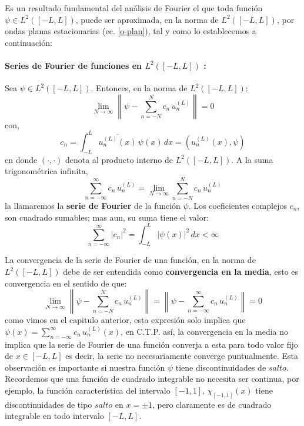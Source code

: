 \documentclass[12pt]{book}
\numberwithin{equation}{chapter}
\def\ol{\overline}
\def\rar{\rightarrow}
\begin{document}
Es un resultado fundamental del an\'alisis de Fourier el que toda funci\'on $\psi \in L^{2}([-L,L])$, puede ser aproximada, en la norma de $L^{2}([-L,L])$, por ondas planas estacionarias (ec. \ref{o-plan}), tal y como lo establecemos a continuaci\'on:

\paragraph{Series de Fourier de funciones en $L^{2}([-L,L])$ :} Sea $\psi \in L^{2}([-L,L])$. Entonces, en la norma de $L^{2}([-L,L])$:
\begin{equation}\label{sn-con}
\lim_{N \rar \infty} \left\| \psi - \sum_{n=-N}^{N} c_{n}\, u_{n}^{(L)} \right\|=0
\end{equation} 
con,
\begin{equation}
c_{n}= \int_{-L}^{L} \ol{u_{n}^{(L)}(x)}\, \psi(x)\, dx= (u_{n}^{(L)}(x),\psi)
\end{equation}
en donde $(\cdot , \cdot)$ denota al producto interno de $L^{2}([-L,L])$. A la suma trigonom\'etrica infinita,
\begin{equation}
\sum_{n=-\infty}^{\infty} c_{n}\, u_{n}^{(L)} =\lim_{N\rar \infty} \sum_{n=-N}^{N} c_{n}\, u_{n}^{(L)}
\end{equation}
la llamaremos la {\bf serie de Fourier} de la funci\'on $\psi$. Los coeficientes complejos $c_{n}$, son cuadrado sumables; mas aun, su suma tiene el valor:
\begin{equation}
\sum_{n=-\infty}^{\infty} |c_{n}|^{2}= \int_{-L}^{L} |\psi(x)|^{2}\, dx < \infty
\end{equation} \rightline{$\dag$}

\vspace{5 mm}

La convergencia de la serie de Fourier de una funci\'on, en la norma de $L^{2}([-L,L])$ debe de ser entendida como {\bf convergencia en la media}, esto es convergencia en el sentido de que:
$$ \lim_{N \rar \infty} \left\| \psi - \sum_{n=-N}^{N} c_{n}\, u_{n}^{(L)} \right\|=  \left\| \psi - \sum_{n=-\infty}^{\infty} c_{n}\, u_{n}^{(L)} \right\|=0 $$ 
como vimos en el capitulo anterior, esta expresi\'on solo implica que $\psi(x)=\sum_{n=-\infty}^{\infty} c_{n}\, u_{n}^{(L)}(x) $, en C.T.P. as\'i, la convergencia en la media no implica que la serie de Fourier de una funci\'on converja a esta para todo valor fijo de $x \in [-L,L]$ es decir, la serie no necesariamente converge puntualmente. Esta observaci\'on es importante si nuestra funci\'on $\psi$ tiene discontinuidades de $salto$. Recordemos que una funci\'on de cuadrado integrable no necesita ser continua, por ejemplo, la funci\'on caracter\'istica del intervalo $[-1,1]$, $\chi_{[-1,1]}(x)$ tiene discontinuidades de tipo $salto$ en $x= \pm 1$, pero claramente es de cuadrado integrable en todo intervalo $[-L,L]$.\\
\end{document}
